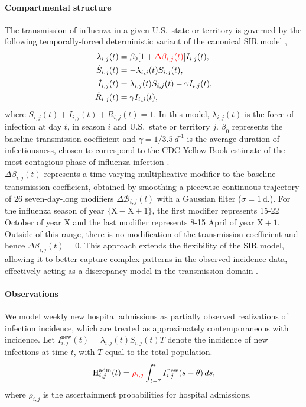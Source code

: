 \documentclass[11pt]{article}
\begin{document}
\paragraph{Compartmental structure} The transmission of influenza in a given U.S.\ state or territory is governed by the following temporally-forced deterministic variant of the canonical SIR model \citep{keeling2008},
\begin{align}
    \lambda_{i,j}(t) &= \beta_0 [1 + \textcolor{red}{\Delta \beta_{i,j}(t)}]  I_{i,j}(t), \nonumber \\
    \dot{S}_{i,j}(t) &= - \lambda_{i,j}(t) S_{i,j}(t), \nonumber \\ 
    \dot{I}_{i,j}(t) &= \lambda_{i,j}(t) S_{i,j}(t) - \gamma I_{i,j}(t), \nonumber \\
    \dot{R}_{i,j}(t) &= \gamma I_{i,j}(t),
    \label{eq:ODE_simulation}
\end{align}
where $S_{i,j}(t) + I_{i,j}(t) + R_{i,j}(t) = 1$. In this model, $\lambda_{i,j}(t)$ is the force of infection at day $t$, in season $i$ and U.S.\ state or territory $j$. $\beta_0$ represents the baseline transmission coefficient and $\gamma=1/3.5~d^{\text{-}1}$ is the average duration of infectiousness, chosen to correspond to the CDC Yellow Book estimate of the most contagious phase of influenza infection \citep{CDCyellowbook}.\\

$\Delta \beta_{i,j}(t)$ represents a time-varying multiplicative modifier to the baseline transmission coefficient, obtained by smoothing a piecewise-continuous trajectory of 26 seven-day-long modifiers $\Delta \mathcal{B}_{i,j}(l)$ with a Gaussian filter ($\sigma = 1~\text{d.}$). For the influenza season of year $\{\text{X}-\text{X}+1\}$, the first modifier represents 15-22 October of year $\text{X}$ and the last modifier represents 8-15 April of year $\text{X}+1$. Outside of this range, there is no modification of the transmission coefficient and hence $\Delta \beta_{i,j}(t)=0$. This approach extends the flexibility of the SIR model, allowing it to better capture complex patterns in the observed incidence data, effectively acting as a discrepancy model in the transmission domain \citep{osthus2019}.

\paragraph{Observations} We model weekly new hospital admissions as partially observed realizations of infection incidence, which are treated as approximately contemporaneous with incidence. Let \( I_{i,j}^{\text{new}}(t) = \lambda_{i,j}(t) S_{i,j}(t) T \) denote the incidence of new infections at time \(t\), with $T$ equal to the total population. 
\begin{equation}\label{eq:observed_states}
    \text{H}^{\text{adm}}_{i,j}(t) 
    = \textcolor{red}{\rho_{i,j}} \int_{t-7}^{t} I^{\text{new}}_{i,j}(s - \theta)\, ds,
\end{equation}
where \( \rho_{i,j} \) is the ascertainment probabilities for hospital admissions.
\end{document}
